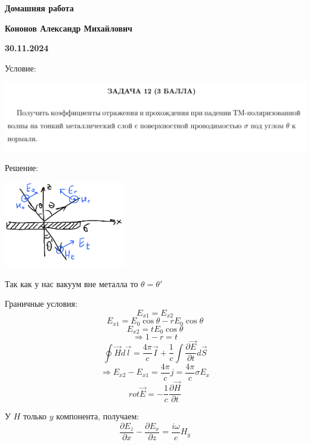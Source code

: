 \documentclass[12pt]{article}
\begin{document}
\begin{large}
\begin{center}
\LARGE \textbf{Домашняя работа}
\par
\LARGE \textbf{Кононов Александр Михайлович}
\par
    \textbf{30.11.2024}
\end{center}
\par Условие:
\par
\includegraphics[width=1\textwidth]{photo.png}
\par Решение:
\par
\par
\begin{center}
\includegraphics[width=0.4\textwidth]{photo_2.png}
\end{center}
\par Так как у нас вакуум вне металла то $\theta = \theta'$
\par Граничные условия:
\[
    E_{x1} = E_{x2}
\]
\[
    E_{x1} = E_0 \cos \theta - r E_0 \cos \theta
\]
\[
    E_{x2} = t E_0 \cos \theta
\]
\[
    \Rightarrow 1 - r = t
\]
\[
    \oint \overrightarrow{H} d \vec{l} = \frac{4 \pi}{c} \overrightarrow{I} + \frac{1}{c} \int \frac{\partial \overrightarrow{E}}{\partial t} d\overrightarrow{S}
\]
\[
     \Rightarrow E_{x2} - E_{x1} = \frac{4\pi}{c} j = \frac{4\pi}{c} \sigma E_x
\]
\[
    rot \overrightarrow{E} = -\frac{1}{c} \frac{\partial \overrightarrow{H}}{\partial t}
\]
\par У $H$ только $y$ компонента, получаем:
\[
    \frac{\partial E_z}{\partial x} - \frac{\partial E_x}{\partial z} = \frac{i \omega }{c} H_y
\]
\end{large}
\end{document}
